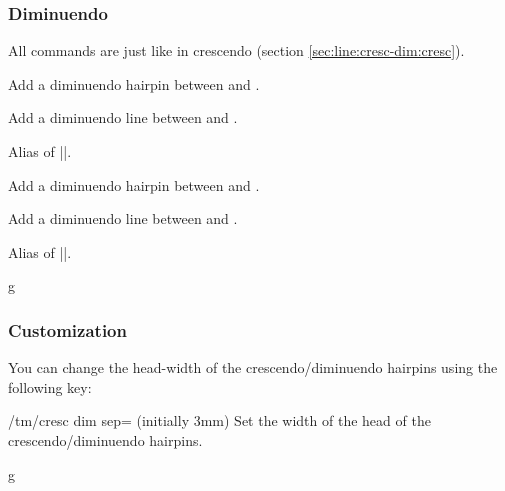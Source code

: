 \subsubsection{Diminuendo}\label{sec:line:cresc-dim:dim}
All commands are just like in crescendo (section \ref{sec:line:cresc-dim:cresc}).
\begin{command}{\tmdiminuendohairpin{}}
  Add a diminuendo hairpin between  and .
\end{command}
\begin{command}{\tmdiminuendoline{}}
  Add a diminuendo line between  and .
\end{command}
\begin{command}{\tmdiminuendo{}}
  Alias of |\tmdiminuendohairpin|.
\end{command}
\begin{command}{\tmdiminuendohairpincoordinate{}}
  Add a diminuendo hairpin between  and .
\end{command}
\begin{command}{\tmdiminuendolinecoordinate{}}
  Add a diminuendo line between  and .
\end{command}
\begin{command}{\tmdiminuendocoordinate{}}
  Alias of |\tmdiminuendohairpincoordinate|.
\end{command}
\begin{codeexample}[]
\begin{tmline}
\begin{tmstaff}{g}{}
\end{tmstaff}
\end{tmline}
\end{codeexample}
\subsubsection{Customization}\label{sec:line:cresc-dim:custom}
You can change the head-width of the crescendo/diminuendo hairpins using the 
following key:
\begin{key}{/tm/cresc dim sep= (initially 3mm)}
  Set the width of the head of the crescendo/diminuendo hairpins.
\end{key}
\begin{codeexample}[]
\begin{tmline}
\begin{tmstaff}{g}{}
\end{tmstaff}
\end{tmline}
\end{codeexample}
